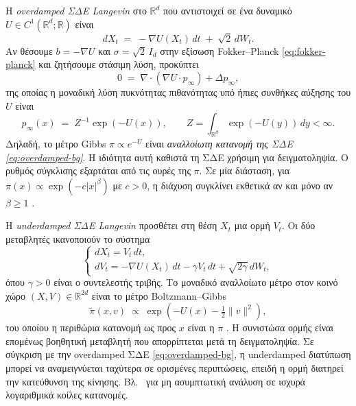Η \emph{overdamped ΣΔΕ Langevin} στο $\mathbb{R}^d$ που αντιστοιχεί σε ένα
δυναμικό $U \in C^1(\mathbb{R}^d; \mathbb{R})$ είναι
\begin{equation}
  dX_t \;=\; -\nabla U(X_t)\, dt \;+\; \sqrt{2}\, dW_t.
  \label{eq:overdamped-bg}
\end{equation}
Αν θέσουμε $b = -\nabla U$ και $\sigma = \sqrt{2}\, I_d$ στην εξίσωση
Fokker--Planck \eqref{eq:fokker-planck} και ζητήσουμε στάσιμη λύση, προκύπτει
\begin{equation}
  0 \;=\; \nabla \cdot (\nabla U \cdot p_\infty) + \Delta p_\infty,
\end{equation}
της οποίας η μοναδική λύση πυκνότητας πιθανότητας υπό ήπιες συνθήκες αύξησης
του $U$ είναι
\begin{equation}
  p_\infty(x) \;=\; Z^{-1} \exp(-U(x)),
  \qquad Z = \int_{\mathbb{R}^d} \exp(-U(y))\, dy < \infty.
  \label{eq:invariant-overdamped}
\end{equation}
Δηλαδή, το μέτρο Gibbs $\pi \propto e^{-U}$ είναι \emph{αναλλοίωτη κατανομή
της ΣΔΕ \eqref{eq:overdamped-bg}}. Η ιδιότητα αυτή καθιστά τη ΣΔΕ
χρήσιμη για δειγματοληψία. Ο ρυθμός σύγκλισης εξαρτάται από τις ουρές της $\pi$. Σε
μία διάσταση, για $\pi(x) \propto \exp(-c|x|^\beta)$ με $c > 0$, η διάχυση συγκλίνει εκθετικά
αν και μόνο αν $\beta \ge 1$ \citep{roberts1996exponential}.

Η \emph{underdamped ΣΔΕ Langevin} προσθέτει στη θέση $X_t$ μια ορμή $V_t$.
Οι δύο μεταβλητές ικανοποιούν το σύστημα
\begin{equation}
  \begin{cases}
    dX_t = V_t\, dt, \\
    dV_t = -\nabla U(X_t)\, dt - \gamma V_t\, dt + \sqrt{2\gamma}\, dW_t,
  \end{cases}
  \label{eq:underdamped-bg}
\end{equation}
όπου $\gamma > 0$ είναι ο συντελεστής τριβής. Το μοναδικό αναλλοίωτο μέτρο στον
κοινό χώρο $(X, V) \in \mathbb{R}^{2d}$ είναι το μέτρο Boltzmann--Gibbs
\begin{equation}
  \tilde\pi(x, v) \;\propto\; \exp\!\left(-U(x) - \tfrac12 \|v\|^2\right),
  \label{eq:invariant-underdamped}
\end{equation}
του οποίου η περιθώρια κατανομή ως προς $x$ είναι η $\pi$
\citep{leimkuhler2015molecular}. Η συνιστώσα ορμής είναι επομένως
βοηθητική μεταβλητή που απορρίπτεται μετά τη δειγματοληψία. Σε σύγκριση με την
overdamped ΣΔΕ \eqref{eq:overdamped-bg}, η underdamped διατύπωση μπορεί να
αναμειγνύεται ταχύτερα σε ορισμένες περιπτώσεις, επειδή η ορμή διατηρεί την κατεύθυνση της κίνησης. Βλ.\ \citet{cheng2018underdamped}
για μη ασυμπτωτική ανάλυση σε ισχυρά λογαριθμικά κοίλες κατανομές.

